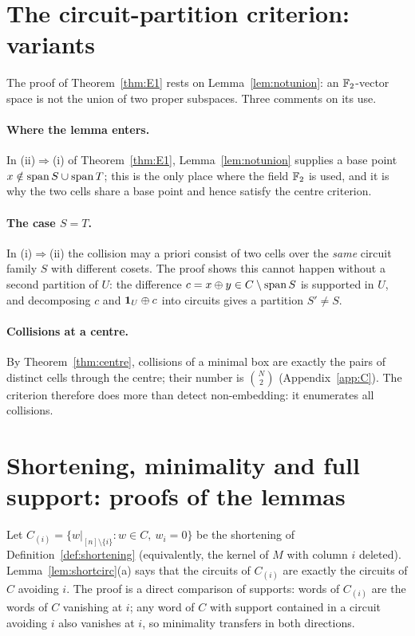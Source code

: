 \section{The circuit-partition criterion: variants}\label{app:D}

The proof of Theorem~\ref{thm:E1} rests on Lemma~\ref{lem:notunion}: an $\mathbb F_2$-vector space is not the union of two proper subspaces. Three comments on its use.

\paragraph{Where the lemma enters.} In (ii)$\Rightarrow$(i) of Theorem~\ref{thm:E1}, Lemma~\ref{lem:notunion} supplies a base point $x\notin\operatorname{span} S\cup\operatorname{span} T$; this is the only place where the field $\mathbb F_2$ is used, and it is why the two cells share a base point and hence satisfy the centre criterion.

\paragraph{The case $S=T$.} In (i)$\Rightarrow$(ii) the collision may a priori consist of two cells over the \emph{same} circuit family $S$ with different cosets. The proof shows this cannot happen without a second partition of $U$: the difference $c=x\oplus y\in C\setminus\operatorname{span} S$ is supported in $U$, and decomposing $c$ and $\mathbf 1_U\oplus c$ into circuits gives a partition $S'\ne S$. 

\paragraph{Collisions at a centre.} By Theorem~\ref{thm:centre}, collisions of a minimal box are exactly the pairs of distinct cells through the centre; their number is $\binom N2$ (Appendix~\ref{app:C}). The criterion therefore does more than detect non-embedding: it enumerates all collisions.

\section{Shortening, minimality and full support: proofs of the lemmas}\label{app:E}

Let $C_{(i)}=\{w|_{[n]\setminus\{i\}}: w\in C,\ w_i=0\}$ be the shortening of Definition~\ref{def:shortening} (equivalently, the kernel of $M$ with column $i$ deleted). Lemma~\ref{lem:shortcirc}(a) says that the circuits of $C_{(i)}$ are exactly the circuits of $C$ avoiding $i$. The proof is a direct comparison of supports: words of $C_{(i)}$ are the words of $C$ vanishing at $i$; any word of $C$ with support contained in a circuit avoiding $i$ also vanishes at $i$, so minimality transfers in both directions.

